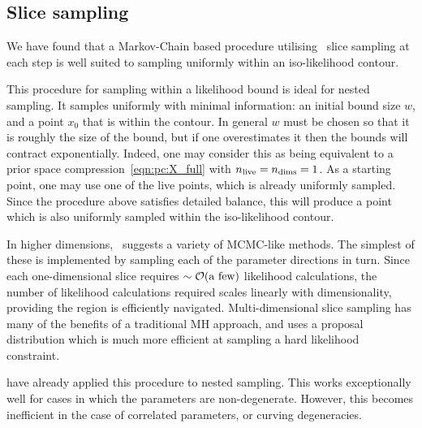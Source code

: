 \subsection{Slice sampling}
\label{sec:bay:slice_sampling}
We have found that a Markov-Chain based procedure utilising~ slice sampling at each step is well suited to sampling uniformly within an iso-likelihood contour.

This procedure for sampling within a likelihood bound is ideal for nested sampling. It samples uniformly with minimal information: an initial bound size $w$, and a point $x_0$ that is within the contour. In general $w$ must be chosen so that it is roughly the size of the bound, but if one overestimates it then the bounds will contract exponentially. Indeed, one may consider this as being equivalent to a prior space compression~\eqref{eqn:pc:X_full} with $n_{\mathrm{live}}=n_{\mathrm{dims}}=1$. As a starting point, one may use one of the live points, which is already uniformly sampled. Since the procedure above satisfies detailed balance, this will produce a point which is also uniformly sampled within the iso-likelihood contour.

In higher dimensions,~\cite{NealSlice} suggests a variety of MCMC-like methods. The simplest of these is implemented by sampling each of the parameter directions in turn. Since each one-dimensional slice requires ${\sim\mathcal{O}{\left(\text{a few}\right)}}$ likelihood calculations, the number of likelihood calculations required scales linearly with dimensionality, providing the region is efficiently navigated. Multi-dimensional slice sampling has many of the benefits of a traditional MH approach, and uses a proposal distribution which is much more efficient at sampling a hard likelihood constraint.

\cite{SystemsBio} have already applied this procedure to nested sampling. This works exceptionally well for cases in which the parameters are non-degenerate. However, this becomes inefficient in the case of correlated parameters, or curving degeneracies.










